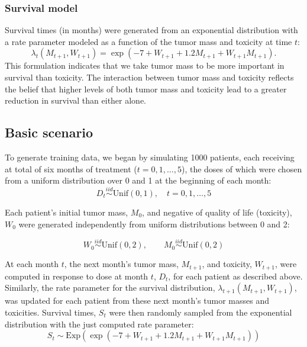 \documentclass[12pt]{article}
\begin{document}

\subsubsection{Survival model} %
\label{ssub:survival_model}

Survival times (in months) were generated from an exponential distribution with a rate parameter modeled as a function of the tumor mass and toxicity at time $t$:
\begin{equation}
  \lambda_{t}(M_{t+1}, W_{t+1}) = \exp(-7 + W_{t+1} + 1.2 M_{t+1} + W_{t+1} M_{t+1}).
\end{equation}
This formulation indicates that we take tumor mass to be more important in survival than toxicity. The interaction between tumor mass and toxicity reflects the belief that higher levels of both tumor mass and toxicity lead to a greater reduction in survival than either alone.



\subsection{Basic scenario} %
\label{sub:basic_setup}

To generate training data, we began by simulating 1000 patients, each receiving at total of six months of treatment ($t = 0, 1, \ldots, 5$), the doses of which were chosen from a uniform distribution over 0 and 1 at the beginning of each month:
\begin{equation}
  D_{t} \overset{iid}{\sim} \text{Unif}(0, 1), \quad t = 0, 1, \ldots, 5
\end{equation}

Each patient's initial tumor mass, $M_{0}$, and negative of quality of life (toxicity), $W_{0}$ were generated independently from uniform distributions between 0 and 2:

\begin{equation}
  W_{0} \overset{iid}{\sim} \text{Unif}(0, 2), \qquad
  M_{0} \overset{iid}{\sim} \text{Unif}(0, 2)
\end{equation}

At each month $t$, the next month's tumor mass, $M_{t + 1}$, and toxicity, $W_{t + 1}$, were computed in response to dose at month $t$, $D_{t}$, for each patient as described above. Similarly, the rate parameter for the survival distribution, $\lambda_{t+1}(M_{t + 1}, W_{t + 1})$, was updated for each patient from these next month's tumor masses and toxicities. Survival times, $S_{t}$ were then randomly sampled from the exponential distribution with the just computed rate parameter:
\begin{equation}
  S_{t} \sim \text{Exp}(\exp(-7 + W_{t+1} + 1.2 M_{t+1} + W_{t+1} M_{t+1}))
\end{equation}
\end{document}
